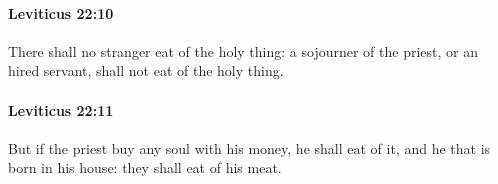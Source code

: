 		\paragraph{Leviticus 22:10} %
			\label{LEVITICUS-22-10}

			There shall no stranger eat of the holy thing: a sojourner of the priest, or an hired servant, shall not eat of the holy thing.


		\paragraph{Leviticus 22:11} %
			\label{LEVITICUS-22-11}

			But if the priest buy any soul with his money, he shall eat of it, and he that is born in his house: they shall eat of his meat.


